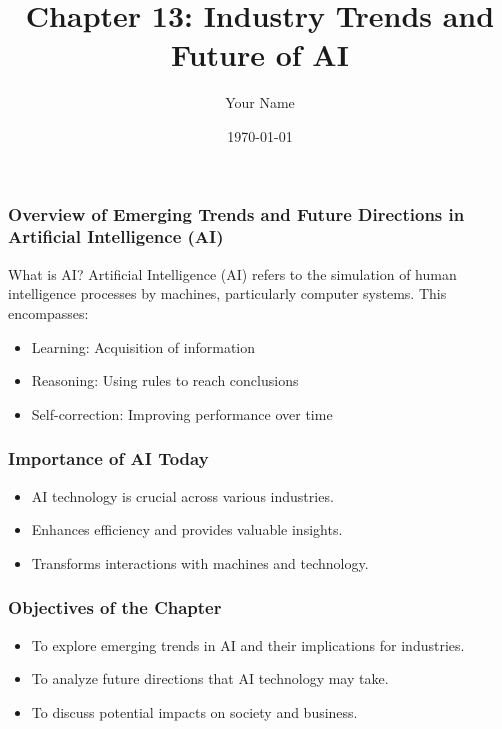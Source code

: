 \documentclass{beamer}
\title{Chapter 13: Industry Trends and Future of AI}
\author{Your Name}
\institute{Your Institution}
\date{\today}
\begin{document}
\frame{\titlepage}

\begin{frame}[fragile]
    \titlepage
\end{frame}

\begin{frame}[fragile]
    \frametitle{Overview of Emerging Trends and Future Directions in Artificial Intelligence (AI)}
    
    \begin{block}{What is AI?}
        Artificial Intelligence (AI) refers to the simulation of human intelligence processes by machines, particularly computer systems. 
        This encompasses:
        \begin{itemize}
            \item Learning: Acquisition of information
            \item Reasoning: Using rules to reach conclusions
            \item Self-correction: Improving performance over time
        \end{itemize}
    \end{block}
\end{frame}

\begin{frame}[fragile]
    \frametitle{Importance of AI Today}
    \begin{itemize}
        \item AI technology is crucial across various industries.
        \item Enhances efficiency and provides valuable insights.
        \item Transforms interactions with machines and technology.
    \end{itemize}
\end{frame}

\begin{frame}[fragile]
    \frametitle{Objectives of the Chapter}
    \begin{itemize}
        \item To explore emerging trends in AI and their implications for industries.
        \item To analyze future directions that AI technology may take.
        \item To discuss potential impacts on society and business.
    \end{itemize}
\end{frame}
\end{document}
